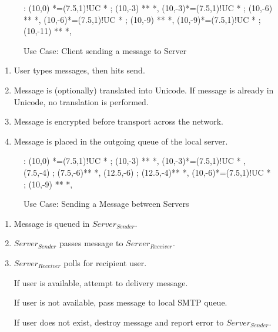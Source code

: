 

\begin{figure}[Hbt]

\xy<1cm,0cm>:
(10,0) *=(7.5,1)!UC *\frm{-} ;
(10,-3) **\dir{-} *\dir{>},
(10,-3)*=(7.5,1)!UC *\frm{=} ; 
(10,-6) **\dir{-} *\dir{>},
(10,-6)*=(7.5,1)!UC *\frm{-} ; 
(10,-9) **\dir{-} *\dir{>},
(10,-9)*=(7.5,1)!UC *\frm{-} ; 
(10,-11) **\dir{=} *\dir{>},
\endxy

\caption{Use Case: Client sending a message to Server}

\end{figure}

\begin{enumerate}

\item User types messages, then hits send.

\item Message is (optionally) translated into Unicode. If message is
already in Unicode, no translation is performed.

\item Message is encrypted before transport across the network.

\item Message is placed in the outgoing queue of the local server.

\end{enumerate}


\begin{figure}[Hbt]

\xy<1cm,0cm>:
(10,0) *=(7.5,1)!UC *\frm{-} ;
(10,-3) **\dir{-} *\dir{>},
(10,-3)*=(7.5,1)!UC *\frm{-} , 
(7.5,-4) ; (7.5,-6)**\dir{-} *\dir{>},
(12.5,-6) ; (12.5,-4)**\dir{--} *\dir{>},
(10,-6)*=(7.5,1)!UC *\frm{-} ; 
(10,-9) **\dir{=} *\dir{>},
\endxy

\caption{Use Case: Sending a Message between Servers}

\end{figure}

\begin{enumerate}

\item Message is queued in $Server_{Sender}$.

\item $Server_{Sender}$ passes message to $Server_{Receiver}$.

\item $Server_{Receiver}$ polls for recipient user. 

\subitem If user is available, attempt to delivery message. 

\subitem If user is not available, pass message to local SMTP queue. 

\subitem If user does not exist, destroy message and report error to $Server_{Sender}$.

\end{enumerate}


